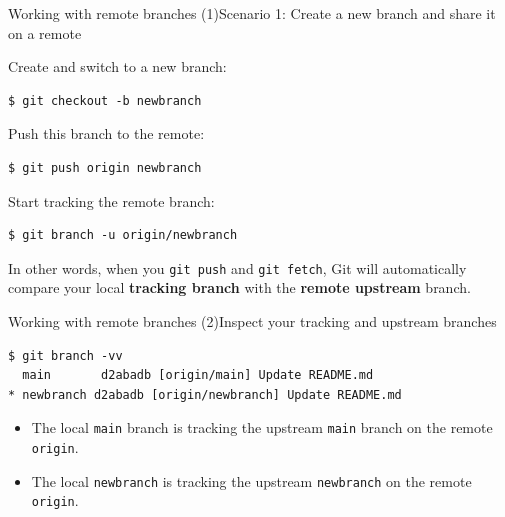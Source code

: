 \documentclass[handout]{beamer}
\begin{document}
\begin{frame}[fragile]{Working with remote branches (1)}{Scenario 1: Create a new branch and share it on a remote}

Create and switch to a new branch:

\begin{lstlisting}
$ git checkout -b newbranch
\end{lstlisting}

Push this branch to the remote: 

\begin{lstlisting}
$ git push origin newbranch
\end{lstlisting}

Start tracking the remote branch:

\begin{lstlisting}
$ git branch -u origin/newbranch
\end{lstlisting}

In other words, when you \texttt{git push} and \texttt{git fetch}, Git will automatically compare your local \textbf{tracking branch} with the \textbf{remote upstream} branch. 

\end{frame}

\begin{frame}[fragile]{Working with remote branches (2)}{Inspect your tracking and upstream branches}

\begin{lstlisting}
$ git branch -vv
  main       d2abadb [origin/main] Update README.md
* newbranch d2abadb [origin/newbranch] Update README.md
\end{lstlisting}

\begin{itemize}
	\item The local \texttt{main} branch is tracking the upstream \texttt{main} branch on the remote \texttt{origin}.
	\item The local \texttt{newbranch} is tracking the upstream \texttt{newbranch} on the remote \texttt{origin}.
\end{itemize} 

\end{frame}
\end{document}
